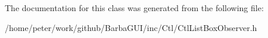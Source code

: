 The documentation for this class was generated from the following file\+:\begin{DoxyCompactItemize}
\item 
/home/peter/work/github/\+Barba\+G\+U\+I/inc/\+Ctl/Ctl\+List\+Box\+Observer.\+h\end{DoxyCompactItemize}
